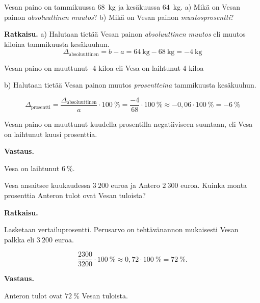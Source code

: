 \begin{esimerkki}
    Vesan paino on tammikuussa $68$~kg ja kesäkuussa $64$~kg.
    \newline a) Mikä on Vesan painon \textit{absoluuttinen muutos}?
    \newline b) Mikä on Vesan painon \textit{muutosprosentti}?
    
    \textbf{Ratkaisu.}
a) Halutaan tietää Vesan painon \textit{absoluuttinen muutos} eli muutos kiloina tammikuusta kesäkuuhun.
    \[
       \Delta_{\text{absoluuttinen}} = b - a = 64~\text{kg} - 68~\text{kg} = -4~\text{kg}
    \]

    Vesan paino on muuttunut -4 kiloa eli Vesa on laihtunut 4 kiloa

b) Halutaan tietää Vesan painon muutos \textit{prosentteina} tammikuusta kesäkuuhun.
    
    \[
        \Delta_{\text{prosentti}}
        = \frac{\Delta_{\text{absoluuttinen}}}{a} \cdot 100~\%
        = \frac{-4}{68} \cdot 100~\%
        \approx -0,06 \cdot 100~\%
        = -6~\% 
    \]
    
    Vesan paino on muuttunut kuudella prosentilla negatiiviseen suuntaan,
    eli Vesa on laihtunut kuusi prosenttia.
    
    \textbf{Vastaus.}
    
    Vesa on laihtunut $6~\%$.
\end{esimerkki}


\begin{esimerkki}
    Vesa ansaitsee kuukaudessa ${3~200}$ euroa ja Antero ${2~300}$ euroa.
    Kuinka monta prosenttia Anteron tulot ovat Vesan tuloista? 
    
    \textbf{Ratkaisu.}
    
    Lasketaan vertailuprosentti. Perusarvo on tehtävänannon mukaisesti
    Vesan palkka eli ${3~200}$ euroa.
    
    \[
        \frac{2300}{3200} \cdot 100~\%
        \approx 0,72\cdot 100~\%
        = 72~\%.
    \]
    
    \textbf{Vastaus.}
    
    Anteron tulot ovat $72~\%$ Vesan tuloista.
\end{esimerkki}

